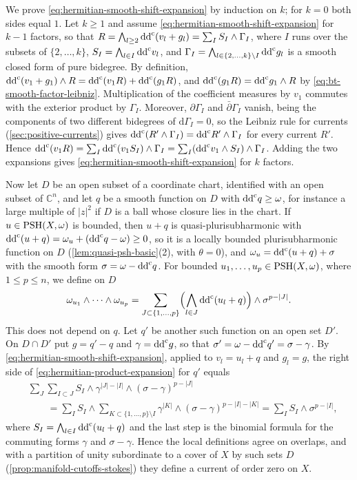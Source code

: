 We prove \eqref{eq:hermitian-smooth-shift-expansion} by induction on $k$; for $k=0$ both sides equal $1$. Let $k\geq1$ and assume \eqref{eq:hermitian-smooth-shift-expansion} for $k-1$ factors, so that $R=\bigwedge_{l\geq2}\mathrm{dd}^{\mathrm{c}}(v_l+g_l)=\sum_IS_I\wedge\Gamma_I$, where $I$ runs over the subsets of $\{2,\ldots,k\}$, $S_I=\bigwedge_{l\in I}\mathrm{dd}^{\mathrm{c}} v_l$, and $\Gamma_I=\bigwedge_{l\in\{2,\ldots,k\}\setminus I}\mathrm{dd}^{\mathrm{c}} g_l$ is a smooth closed form of pure bidegree. By definition, $\mathrm{dd}^{\mathrm{c}}(v_1+g_1)\wedge R=\mathrm{dd}^{\mathrm{c}}(v_1R)+\mathrm{dd}^{\mathrm{c}}(g_1R)$, and $\mathrm{dd}^{\mathrm{c}}(g_1R)=\mathrm{dd}^{\mathrm{c}} g_1\wedge R$ by \eqref{eq:bt-smooth-factor-leibniz}. Multiplication of the coefficient measures by $v_1$ commutes with the exterior product by $\Gamma_I$. Moreover, $\partial\Gamma_I$ and $\bar\partial\Gamma_I$ vanish, being the components of two different bidegrees of $\mathrm d\Gamma_I=0$, so the Leibniz rule for currents (\cref{sec:positive-currents}) gives $\mathrm{dd}^{\mathrm{c}}(R'\wedge\Gamma_I)=\mathrm{dd}^{\mathrm{c}} R'\wedge\Gamma_I$ for every current $R'$. Hence $\mathrm{dd}^{\mathrm{c}}(v_1R)=\sum_I\mathrm{dd}^{\mathrm{c}}(v_1S_I)\wedge\Gamma_I=\sum_I(\mathrm{dd}^{\mathrm{c}} v_1\wedge S_I)\wedge\Gamma_I$. Adding the two expansions gives \eqref{eq:hermitian-smooth-shift-expansion} for $k$ factors.

Now let $D$ be an open subset of a coordinate chart, identified with an open subset of $\mathbb C^n$, and let $q$ be a smooth function on $D$ with $\mathrm{dd}^{\mathrm{c}} q\geq\omega$, for instance a large multiple of $|z|^2$ if $D$ is a ball whose closure lies in the chart. If $u\in\mathrm{PSH}(X,\omega)$ is bounded, then $u+q$ is quasi-plurisubharmonic with $\mathrm{dd}^{\mathrm{c}}(u+q)=\omega_u+(\mathrm{dd}^{\mathrm{c}} q-\omega)\geq0$, so it is a locally bounded plurisubharmonic function on $D$ (\cref{lem:quasi-psh-basic}(2), with $\theta=0$), and $\omega_u=\mathrm{dd}^{\mathrm{c}}(u+q)+\sigma$ with the smooth form $\sigma=\omega-\mathrm{dd}^{\mathrm{c}} q$. For bounded $u_1,\ldots,u_p\in\mathrm{PSH}(X,\omega)$, where $1\leq p\leq n$, we define on $D$
\begin{equation}\label{eq:hermitian-product-expansion}
 \omega_{u_1}\wedge\cdots\wedge\omega_{u_p}
 =\sum_{J\subset\{1,\ldots,p\}}\Bigl(\bigwedge_{l\in J}\mathrm{dd}^{\mathrm{c}}(u_l+q)\Bigr)\wedge\sigma^{p-|J|}.
\end{equation}
This does not depend on $q$. Let $q'$ be another such function on an open set $D'$. On $D\cap D'$ put $g=q'-q$ and $\gamma=\mathrm{dd}^{\mathrm{c}} g$, so that $\sigma'=\omega-\mathrm{dd}^{\mathrm{c}} q'=\sigma-\gamma$. By \eqref{eq:hermitian-smooth-shift-expansion}, applied to $v_l=u_l+q$ and $g_l=g$, the right side of \eqref{eq:hermitian-product-expansion} for $q'$ equals
\begin{align*}
 &\sum_J\sum_{I\subset J}S_I\wedge\gamma^{|J|-|I|}\wedge(\sigma-\gamma)^{p-|J|}\\
 &\qquad=\sum_IS_I\wedge\sum_{K\subset\{1,\ldots,p\}\setminus I}\gamma^{|K|}\wedge(\sigma-\gamma)^{p-|I|-|K|}
 =\sum_IS_I\wedge\sigma^{p-|I|},
\end{align*}
where $S_I=\bigwedge_{l\in I}\mathrm{dd}^{\mathrm{c}}(u_l+q)$ and the last step is the binomial formula for the commuting forms $\gamma$ and $\sigma-\gamma$. Hence the local definitions agree on overlaps, and with a partition of unity subordinate to a cover of $X$ by such sets $D$ (\cref{prop:manifold-cutoffs-stokes}) they define a current of order zero on $X$.

